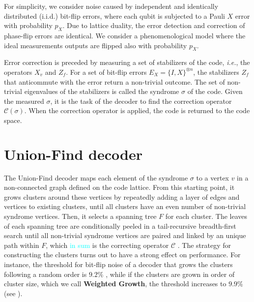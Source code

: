 For simplicity, we consider noise caused by independent and identically distributed (i.i.d.) bit-flip errors, where each qubit is subjected to a Pauli $X$ error with probability $p_X$. Due to {lattice duality}, the error detection and correction of phase-flip errors are identical. We consider a phenomenological model where the ideal measurements outputs are flipped also with probability $p_X$. 

Error correction is preceded by measuring a set of stabilizers of the code, \emph{i.e.}, the operators $X_v$ and $Z_f$. For a set of bit-flip errors $E_X = \{I,X\}^{\otimes n}$, the stabilizers $Z_f$ that anticommute with the error return a non-trivial outcome. The set of non-trivial eigenvalues of the stabilizers is called the syndrome $\sigma$ of the code. Given the measured $\sigma$, it is the task of the decoder to find the correction operator $\mathcal{C}(\sigma)$. When the correction operator is applied, the code is returned to the code space. %

\section{Union-Find decoder}\label{sec:unionfind}
The Union-Find decoder \cite{delfosse2017almost} maps each element of the syndrome $\sigma$ to a vertex $v$ in a non-connected graph defined on the code lattice. From this starting point, it grows clusters around these vertices by repeatedly adding a layer of edges and vertices to existing clusters, until all clusters have an even number of non-trivial syndrome vertices. %
Then, it selects a spanning tree $F$ for each cluster. %
The leaves of each spanning tree are conditionally peeled in a tail-recursive breadth-first search until all non-trivial syndrome vertices are paired and linked by an unique path within $F$, which \textcolor{cyan}{in sum} is the correcting operator $\mathcal{C}$ \cite{delfosse2017almost}. The strategy for constructing the clusters turns out to have a strong effect on performance. For instance, the threshold for bit-flip noise of a decoder that grows the clusters following a random order is $9.2\%$ \cite{delfosse2017almost}, while if the clusters are grown in order of cluster size, which we call \textbf{Weighted Growth}, the threshold increases to $9.9\%$ (see )\cite{delfosse2017almost}. %

